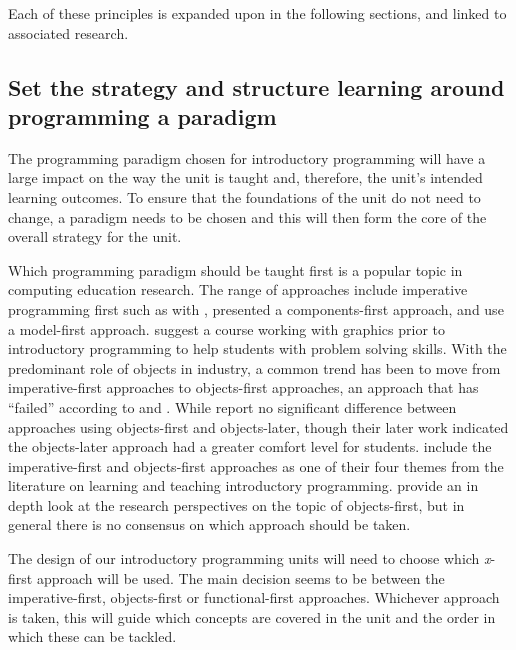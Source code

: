 Each of these principles is expanded upon in the following sections, and linked to associated research.


\subsection{Set the strategy and structure learning around programming a paradigm} %
\label{ssub:set_the_strategy_and_structure_learning_around_programming_a_paradigm}

The programming paradigm chosen for introductory programming will have a large impact on the way the unit is taught and, therefore, the unit's intended learning outcomes. To ensure that the foundations of the unit do not need to change, a paradigm needs to be chosen and this will then form the core of the overall strategy for the unit.

Which programming paradigm should be taught first is a popular topic in computing education research. The range of approaches include imperative programming first such as with \citet{Koffman:1988a}, \citet{Howe:2004} presented a components-first approach, and \citet{Bennedsen:2004} use a model-first approach. \citet{Cooper:2003} suggest a course working with graphics prior to introductory programming to help students with problem solving skills. With the predominant role of objects in industry, a common trend has been to move from imperative-first approaches to objects-first approaches, an approach that has ``failed'' according to \citet{Astrachan:2005} and \citet{Reges:2006}. While \citet{Ehlert:2009} report no significant difference between approaches using objects-first and objects-later, though their later work \cite{Ehlert:2010} indicated the objects-later approach had a greater comfort level for students. \citet{Robins:2003} include the imperative-first and objects-first approaches as one of their four themes from the literature on learning and teaching introductory programming. \citet{Lister:2006a} provide an in depth look at the research perspectives on the topic of objects-first, but in general there is no consensus on which approach should be taken.

The design of our introductory programming units will need to choose which \emph{x}-first approach will be used. The main decision seems to be between the imperative-first, objects-first or functional-first approaches. Whichever approach is taken, this will guide which concepts are covered in the unit and the order in which these can be tackled.

